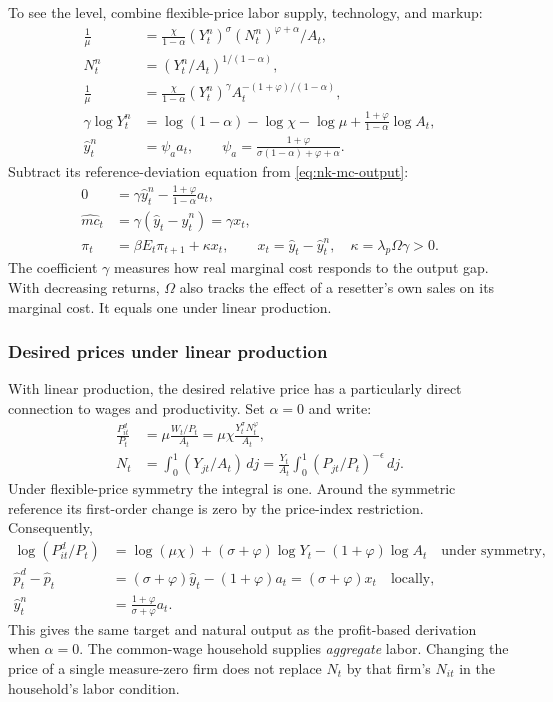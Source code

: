 To see the level, combine flexible-price labor supply, technology, and markup:
\begin{align}
 \frac1\mu&=\frac\chi{1-\alpha}(Y_t^n)^\sigma
           (N_t^n)^{\varphi+\alpha}/A_t,\\
 N_t^n&=(Y_t^n/A_t)^{1/(1-\alpha)},\\
 \frac1\mu&=\frac\chi{1-\alpha}
    (Y_t^n)^\gamma A_t^{-(1+\varphi)/(1-\alpha)},\\
 \gamma\log Y_t^n
 &=\log(1-\alpha)-\log\chi-\log\mu
                         +\frac{1+\varphi}{1-\alpha}\log A_t,\\
 \hat y_t^n&=\psi_a a_t,\qquad
 \psi_a=\frac{1+\varphi}{\sigma(1-\alpha)+\varphi+\alpha}.
 \label{eq:nk-natural-output}
\end{align}
Subtract its reference-deviation equation from \eqref{eq:nk-mc-output}:
\begin{align}
 0&=\gamma\hat y_t^n-\frac{1+\varphi}{1-\alpha}a_t,\\
 \hat{mc}_t&=\gamma(\hat y_t-\hat y_t^n)=\gamma x_t,\\
 \pi_t&=\beta E_t\pi_{t+1}+\kappa x_t,
 \qquad x_t=\hat y_t-\hat y_t^n,\quad
 \kappa=\lambda_p\Omega\gamma>0.
 \label{eq:nk-pc-gap}
\end{align}
The coefficient $\gamma$ measures how real marginal cost responds to the output
gap. With decreasing returns, $\Omega$ also tracks the effect of a resetter's
own sales on its marginal cost. It equals one under linear production.

\subsubsection{Desired prices under linear production}

With linear production, the desired relative price has a particularly direct
connection to wages and productivity. Set $\alpha=0$ and write:
\begin{align}
 \frac{P_{it}^d}{P_t}&=\mu\frac{W_t/P_t}{A_t}
               =\mu\chi\frac{Y_t^\sigma N_t^\varphi}{A_t},\\
 N_t&=\int_0^1(Y_{jt}/A_t)\,dj
      =\frac{Y_t}{A_t}\int_0^1(P_{jt}/P_t)^{-\epsilon}\,dj.
\end{align}
Under flexible-price symmetry the integral is one. Around the symmetric
reference its first-order change is zero by the price-index restriction.
Consequently,
\begin{align}
 \log(P_{it}^d/P_t)
 &=\log(\mu\chi)+(\sigma+\varphi)\log Y_t
                              -(1+\varphi)\log A_t
                              \quad\text{under symmetry},\\
 \hat p_t^d-\hat p_t
 &=(\sigma+\varphi)\hat y_t-(1+\varphi)a_t
   =(\sigma+\varphi)x_t\quad\text{locally},\\
 \hat y_t^n&=\frac{1+\varphi}{\sigma+\varphi}a_t.
\end{align}
This gives the same target and natural output as the profit-based derivation
when $\alpha=0$. The common-wage household supplies \emph{aggregate} labor.
Changing the price of a single measure-zero firm does not replace $N_t$
by that firm's $N_{it}$ in the household's labor condition.


